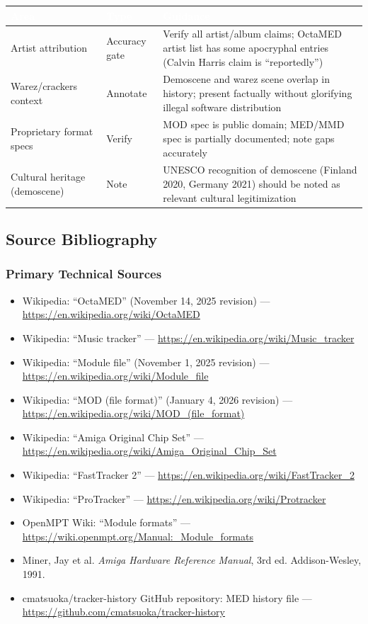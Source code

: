 \documentclass[11pt,letterpaper]{article}
\newcommand{\tableheader}[1]{\textbf{\sffamily\textcolor{white}{#1}}}
\begin{document}
\begin{center}
\begin{tabularx}{\textwidth}{L{4cm}L{3cm}X}
\toprule
{}
\tableheader{Area} & \tableheader{Type} & \tableheader{Guidance} \\
\midrule
Artist attribution & Accuracy gate & Verify all artist/album claims; OctaMED artist list has some apocryphal entries (Calvin Harris claim is ``reportedly'') \\
Warez/crackers context & Annotate & Demoscene and warez scene overlap in history; present factually without glorifying illegal software distribution \\
Proprietary format specs & Verify & MOD spec is public domain; MED/MMD spec is partially documented; note gaps accurately \\
Cultural heritage (demoscene) & Note & UNESCO recognition of demoscene (Finland 2020, Germany 2021) should be noted as relevant cultural legitimization \\
\bottomrule
\end{tabularx}
\end{center}

\subsection{Source Bibliography}

\subsubsection{Primary Technical Sources}
\begin{itemize}[leftmargin=1.5em]
  \item Wikipedia: ``OctaMED'' (November 14, 2025 revision) --- \url{https://en.wikipedia.org/wiki/OctaMED}
  \item Wikipedia: ``Music tracker'' --- \url{https://en.wikipedia.org/wiki/Music_tracker}
  \item Wikipedia: ``Module file'' (November 1, 2025 revision) --- \url{https://en.wikipedia.org/wiki/Module_file}
  \item Wikipedia: ``MOD (file format)'' (January 4, 2026 revision) --- \url{https://en.wikipedia.org/wiki/MOD_(file_format)}
  \item Wikipedia: ``Amiga Original Chip Set'' --- \url{https://en.wikipedia.org/wiki/Amiga_Original_Chip_Set}
  \item Wikipedia: ``FastTracker 2'' --- \url{https://en.wikipedia.org/wiki/FastTracker_2}
  \item Wikipedia: ``ProTracker'' --- \url{https://en.wikipedia.org/wiki/Protracker}
  \item OpenMPT Wiki: ``Module formats'' --- \url{https://wiki.openmpt.org/Manual:_Module_formats}
  \item Miner, Jay et al. \textit{Amiga Hardware Reference Manual}, 3rd ed. Addison-Wesley, 1991.
  \item cmatsuoka/tracker-history GitHub repository: MED history file --- \url{https://github.com/cmatsuoka/tracker-history}
\end{itemize}
\end{document}
